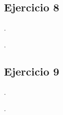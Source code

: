 \begin{Enunciado}
	\subsection*{Ejercicio 8}

	\lipsum[1].
\end{Enunciado}
\vspace*{1em}
\lipsum[1].
\vspace*{2em}
\begin{Enunciado}
	\subsection*{Ejercicio 9}

	\lipsum[1].
\end{Enunciado}
\vspace*{1em}
\lipsum[1].


